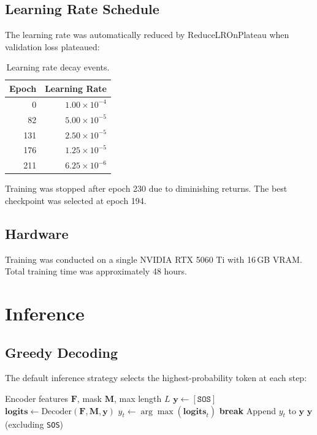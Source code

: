 \documentclass[11pt,a4paper]{article}
\begin{document}
\subsection{Learning Rate Schedule}

The learning rate was automatically reduced by ReduceLROnPlateau when validation loss plateaued:

\begin{table}[H]
\centering
\caption{Learning rate decay events.}
\label{tab:lr}
\begin{tabular}{rr}
\toprule
\textbf{Epoch} & \textbf{Learning Rate} \\
\midrule
0   & $1.00 \times 10^{-4}$ \\
82  & $5.00 \times 10^{-5}$ \\
131 & $2.50 \times 10^{-5}$ \\
176 & $1.25 \times 10^{-5}$ \\
211 & $6.25 \times 10^{-6}$ \\
\bottomrule
\end{tabular}
\end{table}

Training was stopped after epoch 230 due to diminishing returns. The best checkpoint was selected at epoch 194.

\subsection{Hardware}

Training was conducted on a single NVIDIA RTX 5060 Ti with 16\,GB VRAM. Total training time was approximately 48 hours.

\section{Inference}
\label{sec:inference}

\subsection{Greedy Decoding}

The default inference strategy selects the highest-probability token at each step:

\begin{algorithm}[H]
\caption{Greedy Decoding}
\label{alg:greedy}
\begin{algorithmic}[1]
\Require Encoder features $\mathbf{F}$, mask $\mathbf{M}$, max length $L$
\State $\mathbf{y} \gets [\texttt{SOS}]$
  \State $\mathbf{logits} \gets \text{Decoder}(\mathbf{F}, \mathbf{M}, \mathbf{y})$
  \State $y_t \gets \arg\max(\mathbf{logits}_{t})$
    \State \textbf{break}
  \EndIf
  \State Append $y_t$ to $\mathbf{y}$
\EndFor
\State \Return $\mathbf{y}$ (excluding \texttt{SOS})
\end{algorithmic}
\end{algorithm}
\end{document}
